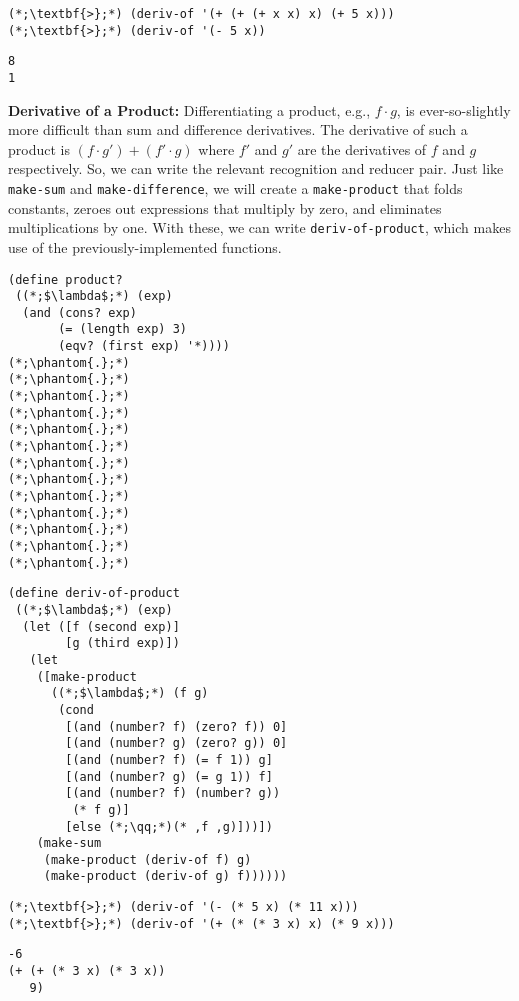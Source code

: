 \begin{cloast}[]{}
\begin{lstlisting}[language=MyNLNScheme]
(*;\textbf{>};*) (deriv-of '(+ (+ (+ x x) x) (+ 5 x)))
(*;\textbf{>};*) (deriv-of '(- 5 x))
\end{lstlisting}
\tcblower
\begin{lstlisting}[language=MyOutput]   
8
1
\end{lstlisting}
\end{cloast}

\textbf{Derivative of a Product:} Differentiating a product, e.g., $f \cdot g$, is ever-so-slightly more difficult than sum and difference derivatives. The derivative of such a product is $(f\cdot g') + (f' \cdot g)$ where $f'$ and $g'$ are the derivatives of $f$ and $g$ respectively. So, we can write the relevant recognition and reducer pair. Just like \texttt{make-sum} and \texttt{make-difference}, we will create a \texttt{make-product} that folds constants, zeroes out expressions that multiply by zero, and eliminates multiplications by one. With these, we can write \texttt{deriv-of-product}, which makes use of the previously-implemented functions.

\begin{clrr}[]{}
\begin{lstlisting}[language=MyScheme]
(define product?
 ((*;$\lambda$;*) (exp)
  (and (cons? exp)
       (= (length exp) 3)
       (eqv? (first exp) '*))))
(*;\phantom{.};*)
(*;\phantom{.};*)
(*;\phantom{.};*)
(*;\phantom{.};*)
(*;\phantom{.};*)
(*;\phantom{.};*)
(*;\phantom{.};*)
(*;\phantom{.};*)
(*;\phantom{.};*)
(*;\phantom{.};*)
(*;\phantom{.};*)
(*;\phantom{.};*)
(*;\phantom{.};*)
\end{lstlisting}
\tcblower
\begin{lstlisting}[language=MyNLNScheme]
(define deriv-of-product
 ((*;$\lambda$;*) (exp)
  (let ([f (second exp)]
        [g (third exp)])
   (let 
    ([make-product
      ((*;$\lambda$;*) (f g)
       (cond
        [(and (number? f) (zero? f)) 0]
        [(and (number? g) (zero? g)) 0]
        [(and (number? f) (= f 1)) g]
        [(and (number? g) (= g 1)) f]
        [(and (number? f) (number? g)) 
         (* f g)]
        [else (*;\qq;*)(* ,f ,g)]))])
    (make-sum
     (make-product (deriv-of f) g)
     (make-product (deriv-of g) f))))))
\end{lstlisting}
\end{clrr}

\begin{cloast}[]{}
\begin{lstlisting}[language=MyNLNScheme]
(*;\textbf{>};*) (deriv-of '(- (* 5 x) (* 11 x)))
(*;\textbf{>};*) (deriv-of '(+ (* (* 3 x) x) (* 9 x)))
\end{lstlisting}
\tcblower
\begin{lstlisting}[language=MyOutput]
-6
(+ (+ (* 3 x) (* 3 x)) 
   9)
\end{lstlisting}
\end{cloast}

